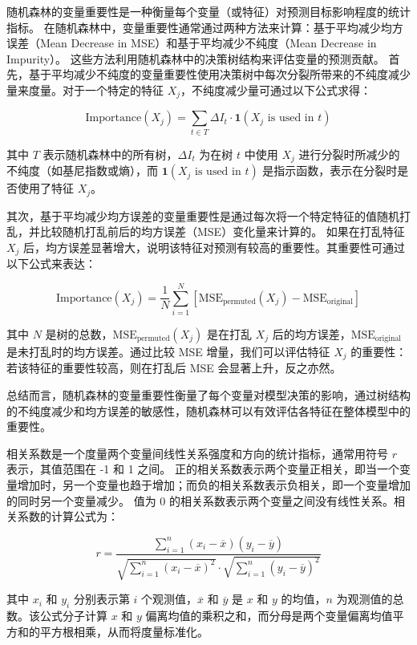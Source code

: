 \documentclass[AutoFakeBold]{LZUThesis-PgD&PhD}
\begin{document}
	
	随机森林的变量重要性是一种衡量每个变量（或特征）对预测目标影响程度的统计指标。
	在随机森林中，变量重要性通常通过两种方法来计算：基于平均减少均方误差（Mean Decrease in MSE）和基于平均减少不纯度（Mean Decrease in Impurity）。
	这些方法利用随机森林中的决策树结构来评估变量的预测贡献。
	首先，基于平均减少不纯度的变量重要性使用决策树中每次分裂所带来的不纯度减少量来度量。对于一个特定的特征 \( X_j \)，不纯度减少量可通过以下公式求得：
	
	\[
	\text{Importance}(X_j) = \sum_{t \in T} \Delta I_t \cdot \mathbf{1}(X_j \text{ is used in } t)
	\]
	
	其中 \( T \) 表示随机森林中的所有树，\( \Delta I_t \) 为在树 \( t \) 中使用 \( X_j \) 进行分裂时所减少的不纯度（如基尼指数或熵），而 \( \mathbf{1}(X_j \text{ is used in } t) \) 是指示函数，表示在分裂时是否使用了特征 \( X_j \)。
	
	其次，基于平均减少均方误差的变量重要性是通过每次将一个特定特征的值随机打乱，并比较随机打乱前后的均方误差（MSE）变化量来计算的。
	如果在打乱特征 \( X_j \) 后，均方误差显著增大，说明该特征对预测有较高的重要性。其重要性可通过以下公式来表达：
	
	\[
	\text{Importance}(X_j) = \frac{1}{N} \sum_{i=1}^{N} \left[ \text{MSE}_{\text{permuted}}(X_j) - \text{MSE}_{\text{original}} \right]
	\]
	
	其中 \( N \) 是树的总数，\( \text{MSE}_{\text{permuted}}(X_j) \) 是在打乱 \( X_j \) 后的均方误差，\( \text{MSE}_{\text{original}} \) 是未打乱时的均方误差。通过比较 MSE 增量，我们可以评估特征 \( X_j \) 的重要性：若该特征的重要性较高，则在打乱后 MSE 会显著上升，反之亦然。
	
	总结而言，随机森林的变量重要性衡量了每个变量对模型决策的影响，通过树结构的不纯度减少和均方误差的敏感性，随机森林可以有效评估各特征在整体模型中的重要性。
	
	相关系数是一个度量两个变量间线性关系强度和方向的统计指标，通常用符号 \( r \) 表示，其值范围在 -1 和 1 之间。
	正的相关系数表示两个变量正相关，即当一个变量增加时，另一个变量也趋于增加；而负的相关系数表示负相关，即一个变量增加的同时另一个变量减少。
	值为 0 的相关系数表示两个变量之间没有线性关系。相关系数的计算公式为：
	
	\[
	r = \frac{\sum_{i=1}^{n} (x_i - \overline{x})(y_i - \overline{y})}{\sqrt{\sum_{i=1}^{n} (x_i - \overline{x})^2} \cdot \sqrt{\sum_{i=1}^{n} (y_i - \overline{y})^2}}
	\]
	
	其中 \( x_i \) 和 \( y_i \) 分别表示第 \( i \) 个观测值，\( \overline{x} \) 和 \( \overline{y} \) 是 \( x \) 和 \( y \) 的均值，\( n \) 为观测值的总数。该公式分子计算 \( x \) 和 \( y \) 偏离均值的乘积之和，而分母是两个变量偏离均值平方和的平方根相乘，从而将度量标准化。
	
\end{document}
